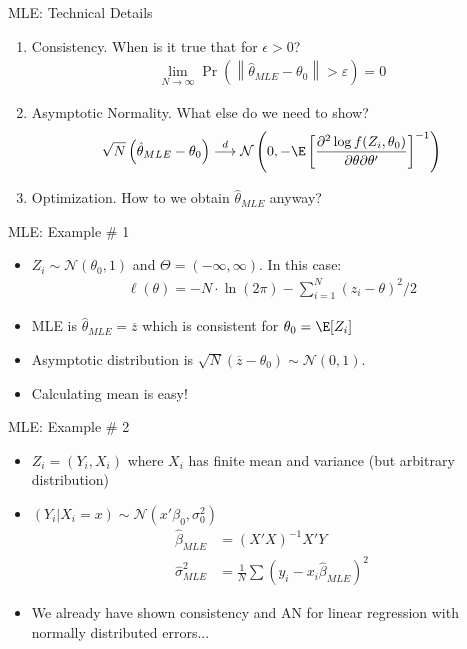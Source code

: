 \documentclass[aspectratio=169,11pt]{beamer}
\begin{document}
\begin{frame}{MLE: Technical Details}
\begin{enumerate}
\item Consistency. When is it true that for $\epsilon>0$?
\begin{align*}
\lim _ { N \rightarrow \infty } \Pr \left( \left\| \hat { \theta } _ { MLE } - \theta _ { 0 } \right\| > \varepsilon \right) = 0
\end{align*}
\item Asymptotic Normality. What else do we need to show?
\begin{align*}
\sqrt { N } \left( \hat { \theta } _ { MLE } - \theta _ { 0 } \right) \stackrel { d } { \longrightarrow } \mathcal { N } \left( 0 , - \E \left[  \frac { \partial ^ { 2 }\log f(Z _ { i } , \theta _ { 0 } ) } { \partial \theta \partial \theta ^ { \prime } }   \right] ^ { - 1 } \right)
\end{align*}
\item Optimization. How to we obtain $\widehat{\theta}_{MLE}$ anyway?
\end{enumerate}
\end{frame}


\begin{frame}{MLE: Example \# 1}
\begin{itemize}
\item $Z_i \sim \mathcal{N}(\theta_0,1)$ and $\Theta = (-\infty,\infty)$. In this case:
\begin{align*}
\ell ( \theta ) = - N \cdot \ln ( 2 \pi ) - \sum _ { i = 1 } ^ { N } \left( z _ { i } - \theta \right) ^ { 2 } / 2
\end{align*}
\item MLE is $\widehat{\theta}_{MLE}=\overline{z}$ which is consistent for $\theta_0 = \E[Z_i]$
\item Asymptotic distribution is $\sqrt{N} ( \overline{z}-\theta_0) \sim \mathcal{N}(0,1)$.
\item Calculating mean is easy!
\end{itemize}
\end{frame}




\begin{frame}{MLE: Example \# 2}
\begin{itemize}
\item $Z_i = (Y_i, X_i)$ where  $X_i$ has finite mean and variance (but arbitrary distribution)
\item $(Y_i | X_i  =x) \sim  \mathcal{N}(x' \beta_0, \sigma_0^2)$
\begin{align*}
\widehat{\beta}_{MLE} &= (X'X)^{-1} X'Y\\
\widehat{\sigma}^2_{MLE} &= \frac{1}{N} \sum (y_i - x_i \widehat{\beta}_{MLE})^2
\end{align*}
\item We already have shown consistency and AN for linear regression with normally distributed errors...
\end{itemize}
\end{frame}
\end{document}
